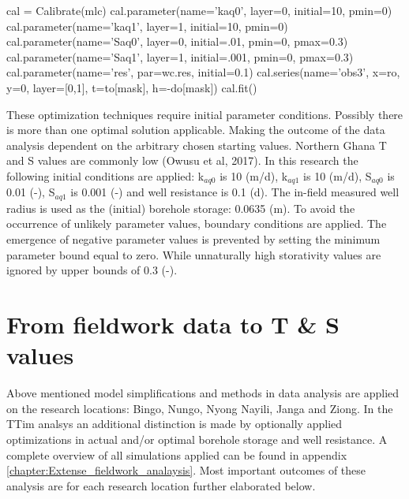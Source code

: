 \begin{python}[h!]
cal = Calibrate(mlc)
cal.parameter(name='kaq0', layer=0, initial=10, pmin=0)
cal.parameter(name='kaq1', layer=1, initial=10, pmin=0)
cal.parameter(name='Saq0', layer=0, initial=.01, pmin=0, pmax=0.3)
cal.parameter(name='Saq1', layer=1, initial=.001, pmin=0, pmax=0.3)
cal.parameter(name='res', par=wc.res, initial=0.1)
cal.series(name='obs3', x=ro, y=0, layer=[0,1], t=to[mask], h=-do[mask])
cal.fit()
\end{python}

These optimization techniques require initial parameter conditions. Possibly there is more than one optimal solution applicable. Making the outcome of the data analysis dependent on the arbitrary chosen starting values. Northern Ghana T and S values are commonly low (Owusu et al, 2017). In this  research the following initial conditions are applied: k$_{aq0}$ is 10 (m/d), k$_{aq1}$ is 10 (m/d), S$_{aq0}$ is 0.01 (-), S$_{aq1}$ is 0.001 (-) and well resistance is 0.1 (d). The in-field measured well radius is used as the (initial) borehole storage: 0.0635 (m). To avoid the occurrence of unlikely parameter values, boundary conditions are applied. The emergence of negative parameter values is prevented by setting the minimum parameter bound equal to zero. While unnaturally high storativity values are ignored by upper bounds of 0.3 (-).\


\section{From fieldwork data to T \& S values}
\label{section:TS}
Above mentioned model simplifications and methods in data analysis are applied on the research locations: Bingo, Nungo, Nyong Nayili, Janga and Ziong. In the TTim analsys an additional distinction is made by optionally applied optimizations in actual and/or optimal borehole storage and well resistance. A complete overview of all simulations applied can be found in appendix \ref{chapter:Extense_fieldwork_analaysis}. Most important outcomes of these analysis are for each research location further elaborated below.

